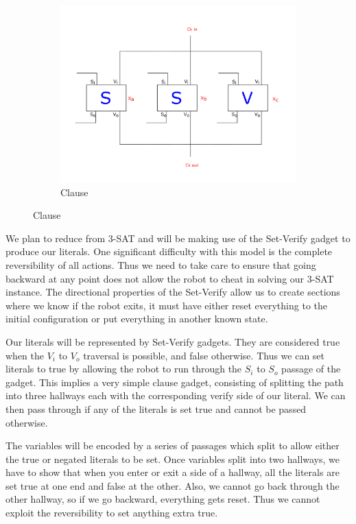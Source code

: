 \documentclass[11pt]{article}
\begin{document}
\begin{figure}[!ht]
  \centering
  \begin{subfigure}[b]{0.9\textwidth}
    \includegraphics[width=\textwidth]{NPClauseGadget}
    \caption{Clause}
    \label{NPClauseGadget}
  \end{subfigure}
\end{figure}

We plan to reduce from 3-SAT and will be making use of the Set-Verify gadget to produce our literals. One significant difficulty with this model is the complete reversibility of all actions. Thus we need to take care to ensure that going backward at any point does not allow the robot to cheat in solving our 3-SAT instance. The directional properties of the Set-Verify allow us to create sections where we know if the robot exits, it must have either reset everything to the initial configuration or put everything in another known state.

Our literals will be represented by Set-Verify gadgets. They are considered true when the $V_i$ to $V_o$ traversal is possible, and false otherwise. Thus we can set literals to true by allowing the robot to run through the $S_i$ to $S_o$ passage of the gadget. This implies a very simple clause gadget, consisting of splitting the path into three hallways each with the corresponding verify side of our literal. We can then pass through if any of the literals is set true and cannot be passed otherwise.

The variables will be encoded by a series of passages which split to allow either the true or negated literals to be set. Once variables split into two hallways, we have to show that when you enter or exit a side of a hallway, all the literals are set true at one end and false at the other. Also, we cannot go back through the other hallway, so if we go backward, everything gets reset. Thus we cannot exploit the reversibility to set anything extra true.
\end{document}

